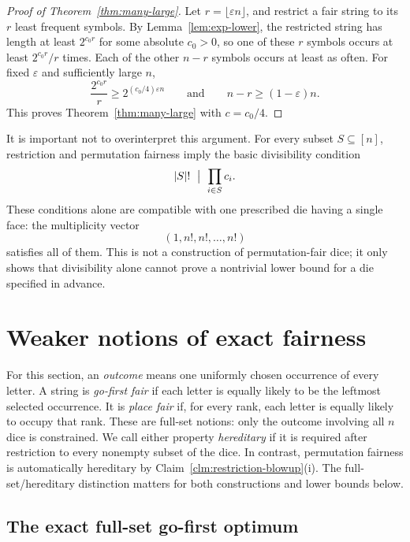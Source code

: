 \documentclass[11pt]{article}
\theoremstyle{definition}
\theoremstyle{remark}
\begin{document}
\begin{proof}[Proof of Theorem~\ref{thm:many-large}]
Let \(r=\lfloor\varepsilon n\rfloor\), and restrict a fair string to its
\(r\) least frequent symbols.  By Lemma~\ref{lem:exp-lower}, the restricted
string has length at least \(2^{c_0r}\) for some absolute \(c_0>0\), so one
of these \(r\) symbols occurs at least \(2^{c_0r}/r\) times.  Each of the
other \(n-r\) symbols occurs at least as often.  For fixed \(\varepsilon\)
and sufficiently large \(n\),
\[
  \frac{2^{c_0r}}{r}\geq2^{(c_0/4)\varepsilon n}
  \qquad\text{and}\qquad
  n-r\geq(1-\varepsilon)n.
\]
This proves Theorem~\ref{thm:many-large} with \(c=c_0/4\).
\end{proof}


It is important not to overinterpret this argument.  For every subset
\(S\subseteq[n]\), restriction and permutation fairness imply the basic
divisibility condition
\[
  |S|!\ \bigm|\ \prod_{i\in S}c_i.
\]
These conditions alone are compatible with one prescribed die having a
single face: the multiplicity vector
\[
  (1,n!,n!,\ldots,n!)
\]
satisfies all of them.  This is not a construction of permutation-fair dice;
it only shows that divisibility alone cannot prove a nontrivial lower bound
for a die specified in advance.



\section{Weaker notions of exact fairness}\label{sec:weaker}

For this section, an \emph{outcome} means one uniformly chosen occurrence of
every letter.  A string is \emph{go-first fair} if each letter is equally
likely to be the leftmost selected occurrence.  It is \emph{place fair} if,
for every rank, each letter is equally likely to occupy that rank.  These are
full-set notions: only the outcome involving all \(n\) dice is constrained.
We call either property \emph{hereditary} if it is required after restriction
to every nonempty subset of the dice.  In contrast, permutation fairness is
automatically hereditary by Claim~\ref{clm:restriction-blowup}(i).  The
full-set/hereditary distinction matters for both constructions and lower
bounds below.

\subsection{The exact full-set go-first optimum}
\end{document}

